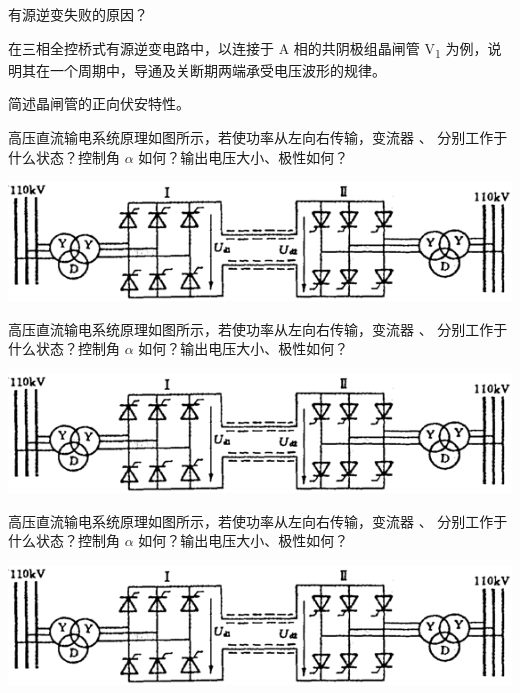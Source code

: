 \documentclass[电力电子]{subfiles}
\begin{document}
\begin{ti}[5 分]
	有源逆变失败的原因？
\end{ti}

\begin{ti}[5 分]
	在三相全控桥式有源逆变电路中，以连接于 A 相的共阴极组晶闸管 V\textsubscript{1} 为例，说明其在一个周期中，导通及关断期两端承受电压波形的规律。
\end{ti}

\begin{ti}[5 分]
	简述晶闸管的正向伏安特性。
\end{ti}

\begin{ti}[10 分]
	高压直流输电系统原理如图所示，若使功率从左向右传输，变流器 、 分别工作于什么状态？控制角 $\alpha$ 如何？输出电压大小、极性如何？
	\begin{center}
		\includegraphics{figure/fig4.png}
	\end{center}
\end{ti}

\begin{ti}[10 分]
	高压直流输电系统原理如图所示，若使功率从左向右传输，变流器 、 分别工作于什么状态？控制角 $\alpha$ 如何？输出电压大小、极性如何？
	\begin{center}
		\includegraphics{figure/fig4.png}
	\end{center}
\end{ti}

\begin{ti}[10 分]
	高压直流输电系统原理如图所示，若使功率从左向右传输，变流器 、 分别工作于什么状态？控制角 $\alpha$ 如何？输出电压大小、极性如何？
	\begin{center}
		\includegraphics{figure/fig4.png}
	\end{center}
\end{ti}
\end{document}
